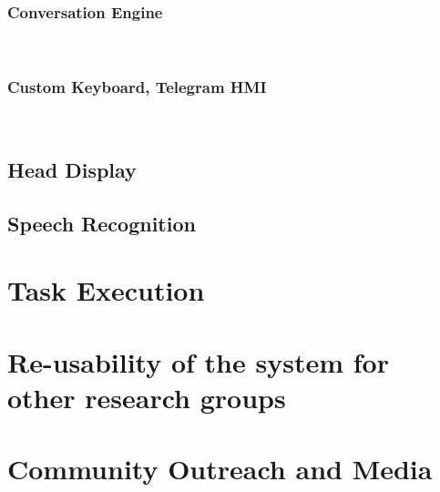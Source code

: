 \documentclass[runningheads,a4paper]{llncs}
\begin{document}
\subsubsection{Conversation Engine}\

\subsubsection{Custom Keyboard, Telegram HMI}\


\subsection{Head Display}


\subsection{Speech Recognition}


\section{Task Execution}


\section{Re-usability of the system for other research groups}


\section{Community Outreach and Media}







%
\newpage
\appendix

\end{document}
